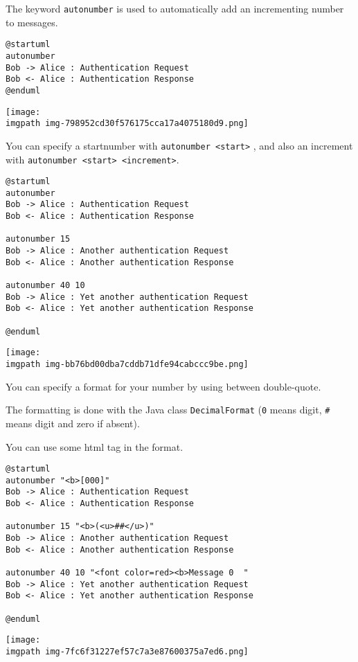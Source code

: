 The keyword \texttt{autonumber} is used to
automatically add an incrementing number to messages.


\begin{verbatim}
@startuml
autonumber
Bob -> Alice : Authentication Request
Bob <- Alice : Authentication Response
@enduml
\end{verbatim}
\begin{center}
\texttt{[image: \\imgpath img-798952cd30f576175cca17a4075180d9.png]}
\end{center}


You can specify a startnumber with \texttt{autonumber <start>} , and
also an increment with \texttt{autonumber <start> <increment>}.




\begin{verbatim}
@startuml
autonumber
Bob -> Alice : Authentication Request
Bob <- Alice : Authentication Response

autonumber 15
Bob -> Alice : Another authentication Request
Bob <- Alice : Another authentication Response

autonumber 40 10
Bob -> Alice : Yet another authentication Request
Bob <- Alice : Yet another authentication Response

@enduml
\end{verbatim}
\begin{center}
\texttt{[image: \\imgpath img-bb76bd00dba7cddb71dfe94cabccc9be.png]}
\end{center}




You can specify a format for your number by using between double-quote.


The formatting is done with the Java class \texttt{DecimalFormat}
(\texttt{0} means digit, \texttt{\#} means digit and zero if absent).


You can use some html tag in the format.
\begin{verbatim}
@startuml
autonumber "<b>[000]"
Bob -> Alice : Authentication Request
Bob <- Alice : Authentication Response

autonumber 15 "<b>(<u>##</u>)"
Bob -> Alice : Another authentication Request
Bob <- Alice : Another authentication Response

autonumber 40 10 "<font color=red><b>Message 0  "
Bob -> Alice : Yet another authentication Request
Bob <- Alice : Yet another authentication Response

@enduml
\end{verbatim}
\begin{center}
\texttt{[image: \\imgpath img-7fc6f31227ef57c7a3e87600375a7ed6.png]}
\end{center}


